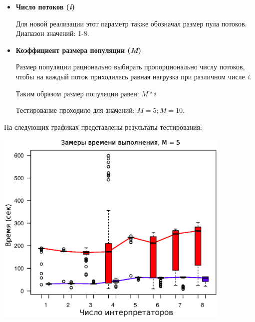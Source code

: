 \begin{itemize}
    \item \textbf{Число потоков (\textit{i})}

        Для новой реализации этот параметр также
        обозначал размер пула потоков.
        Диапазон значений: 1-8.
    \item \textbf{Коэффициент размера популяции (\textit{M})}

        Размер популяции рационально выбирать
        пропорционально числу потоков,
        чтобы на каждый поток приходилась
        равная нагрузка при различном
        числе \textit{i}.

        Таким образом размер популяции равен:
        \begin{math}M * i\end{math}

        Тестирование проходило для значений:
        \begin{math}M = 5; M = 10\end{math}.
\end{itemize}

\break
На следующих графиках представлены результаты тестирования:

\noindent
\begin{center}
\includegraphics[width=0.85\textwidth]{m5}
\end{center}

